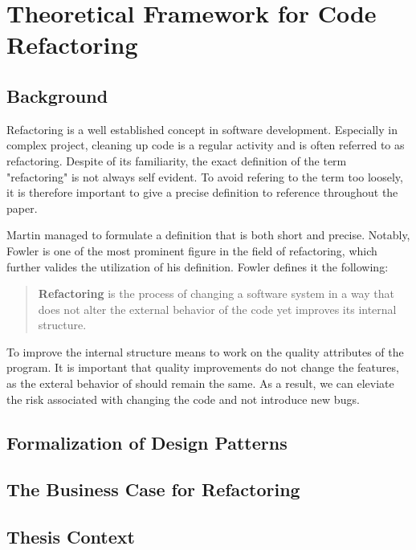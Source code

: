 \chapter{Theoretical Framework for Code Refactoring}

\section{Background}



Refactoring is a well established concept in software development. 
Especially in complex project, 
	cleaning up code is a regular activity and is often referred to as refactoring. 
Despite of its familiarity, 
	the exact definition of the term "refactoring" is not always self evident.
To avoid refering to the term too loosely, 
	it is therefore important to give a precise definition to reference throughout the paper. 

Martin \textcite{fowler2018} managed to formulate a definition that is both short and precise. 
Notably, Fowler is one of the most prominent figure in the field of refactoring,
	which further valides the utilization of his definition.
Fowler defines it the following:

\begin{quote}
\textbf{Refactoring} is the process of changing a software system in a way 
	that does not alter the external behavior of the code yet improves its internal structure.
\end{quote}

To improve the internal structure means to work on the quality attributes of the program. 
It is important that quality improvements do not change the features, 
	as the exteral behavior of should remain the same. 
As a result, we can eleviate the risk associated with changing the code and not introduce new bugs. 






\section{Formalization of Design Patterns}
\section{The Business Case for Refactoring}
\section{Thesis Context}
